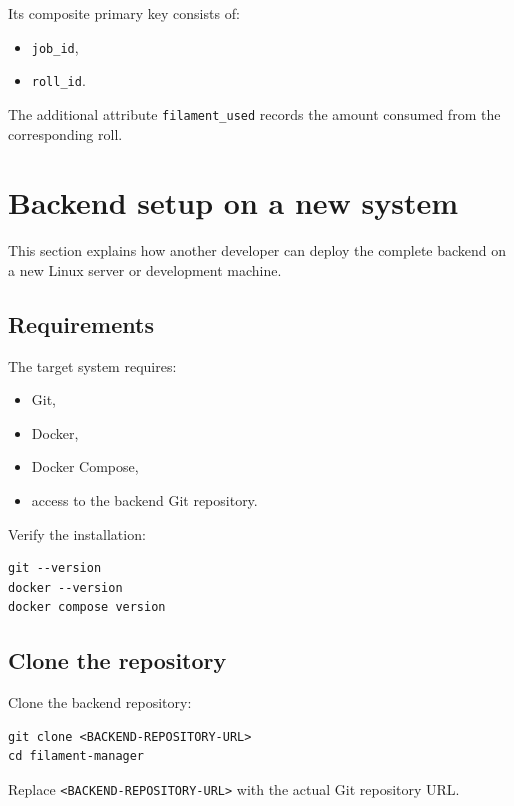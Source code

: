 \documentclass[a4paper,11pt]{article}
\begin{document}
Its composite primary key consists of:

\begin{itemize}
  \item \texttt{job\_id},
  \item \texttt{roll\_id}.
\end{itemize}

The additional attribute \texttt{filament\_used} records the amount consumed
from the corresponding roll.

\section{Backend setup on a new system}

This section explains how another developer can deploy the complete backend
on a new Linux server or development machine.

\subsection{Requirements}

The target system requires:

\begin{itemize}
  \item Git,
  \item Docker,
  \item Docker Compose,
  \item access to the backend Git repository.
\end{itemize}

Verify the installation:

\begin{lstlisting}
git --version
docker --version
docker compose version
\end{lstlisting}

\subsection{Clone the repository}

Clone the backend repository:

\begin{lstlisting}
git clone <BACKEND-REPOSITORY-URL>
cd filament-manager
\end{lstlisting}

Replace \texttt{<BACKEND-REPOSITORY-URL>} with the actual Git repository URL.
\end{document}
